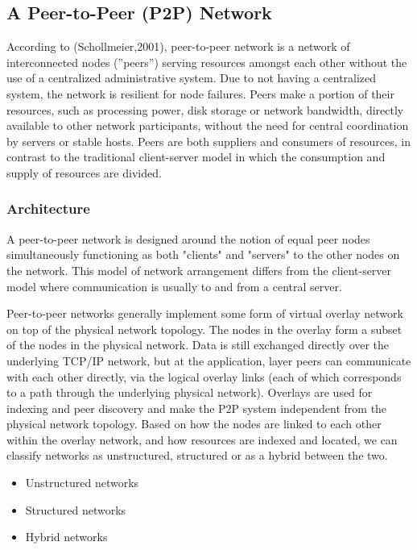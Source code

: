 \subsection{A Peer-to-Peer (P2P) Network}


\vspace{12pt}
According to (Schollmeier,2001)\cite{define_P_to_p}, peer-to-peer network is a network of interconnected nodes (”peers”) serving resources amongst each other without the use of a centralized administrative system. Due to not having a centralized system, the network is resilient for node failures. Peers make a portion of their resources, such as processing power, disk storage or network bandwidth, directly available to other network participants, without the need for central coordination by servers or stable hosts. Peers are both suppliers and consumers of resources, in contrast to the traditional client-server model in which the consumption and supply of resources are divided.

\vspace{12pt}
\subsubsection{Architecture}
\vspace{12pt}
A peer-to-peer network is designed around the notion of equal peer nodes simultaneously functioning as both "clients" and "servers" to the other nodes on the network. This model of network arrangement differs from the client-server model where communication is usually to and from a central server.

\vspace{12pt}

Peer-to-peer networks generally implement some form of virtual overlay network on top of the physical network topology. The nodes in the overlay form a subset of the nodes in the physical network. Data is still exchanged directly over the underlying TCP/IP network, but at the application, layer peers can communicate with each other directly, via the logical overlay links (each of which corresponds to a path through the underlying physical network). Overlays are used for indexing and peer discovery and make the P2P system independent from the physical network topology.
\vspace{12pt}
\clearpage
Based on how the nodes are linked to each other within the overlay network, and how resources are indexed and located, we can classify networks as unstructured, structured or as a hybrid between the two.
\vspace{12pt}
\begin{itemize}
	\item  Unstructured networks 
	\item   Structured networks 
	\item  Hybrid networks 
	
\end{itemize}
